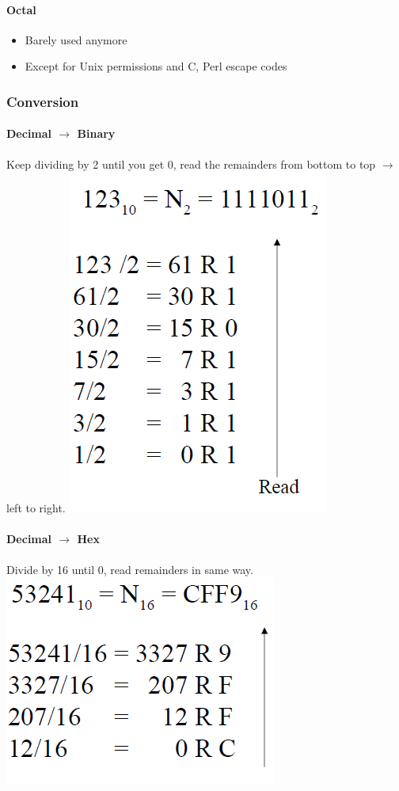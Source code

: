 \documentclass[12 pt]{article}
\begin{document}
	\paragraph{Octal}
	\begin{itemize}
		\item Barely used anymore
		\item Except for Unix permissions and C, Perl escape codes
	\end{itemize}
	\subsubsection{Conversion}
	\paragraph{Decimal $\to$ Binary} Keep dividing by 2 until you get 0, read the remainders from bottom to top $\to$ left to right. \includegraphics[scale=0.5]{dbc}
	\paragraph{Decimal $\to$ Hex} Divide by 16 until 0, read remainders in same way.\\ \includegraphics[scale=0.5]{dhc}
\end{document}
